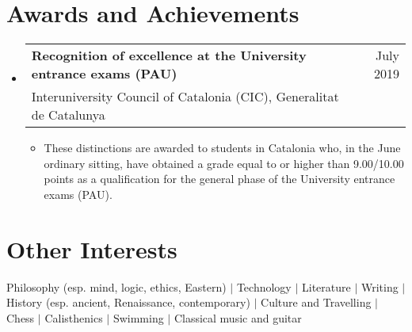 \documentclass[a4paper,10pt]{article}
\makeatletter
\newcommand{\resumeQuadHeading}[4]{
  \item
  \begin{tabular*}{0.96\textwidth}[t]{l@{\extracolsep{\fill}}r}
    \textbf{#1} & \small #2 \\
    \small#3 & \small #4 \\
  \end{tabular*}
}
\newcommand{\resumeHeadingListStart}{
  \begin{itemize}[leftmargin=0.15in, label={}]
}
\newcommand{\resumeHeadingListEnd}{\end{itemize}}
\makeatother
\begin{document}

\section{Awards and Achievements}
  \resumeHeadingListStart{}
    \resumeQuadHeading{Recognition of excellence at the University entrance exams (PAU)}{July 2019}{Interuniversity Council of Catalonia (CIC), Generalitat de Catalunya}{\ }
    \begin{itemize}[leftmargin=3em, itemsep=0.1em, topsep=2pt]
      \item \small These distinctions are awarded to students in Catalonia who, in the June ordinary sitting, have obtained a grade equal to or higher than 9.00/10.00 points as a qualification for the general phase of the University entrance exams (PAU).
    \end{itemize}
  \resumeHeadingListEnd{}

\section{Other Interests}
  Philosophy \small{(esp. mind, logic, ethics, Eastern)} \normalsize{\; $|$ \; Technology \; $|$ \; Literature \; $|$ \; Writing \; $|$ \; History} \small{(esp. ancient, Renaissance, contemporary)} \normalsize{\; $|$ \; Culture and Travelling \; $|$ \; Chess \; $|$ \; Calisthenics \; $|$ \; Swimming \; $|$ \; Classical music and guitar}
\end{document}
